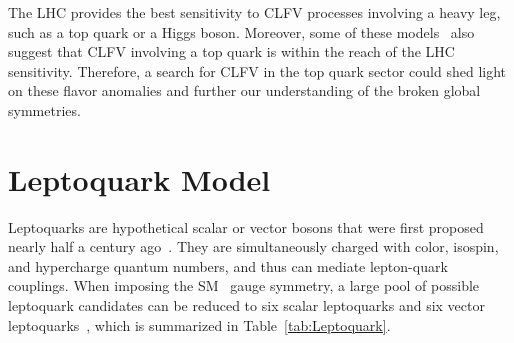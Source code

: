 The \ac{LHC} provides the best sensitivity to \ac{CLFV} processes involving a heavy leg, such as a top quark or a Higgs boson. Moreover, some of these models~\cite{Kim:2018oih} also suggest that \ac{CLFV} involving a top quark is within the reach of the \ac{LHC} sensitivity. Therefore, a search for \ac{CLFV} in the top quark sector could shed light on these flavor anomalies and further our understanding of the broken global symmetries.

\section{Leptoquark Model}
\label{sec:Leptoquark}

Leptoquarks are hypothetical scalar or vector bosons that were first proposed nearly half a century ago~\cite{Pati:1973uk}. They are simultaneously charged with color, isospin, and hypercharge quantum numbers, and thus can mediate lepton-quark couplings. When imposing the \ac{SM} \sm~gauge symmetry, a large pool of possible leptoquark candidates can be reduced to six scalar leptoquarks and six vector leptoquarks~\cite{Dorsner:2016wpm}, which is summarized in Table~\ref{tab:Leptoquark}. 

